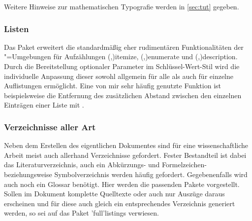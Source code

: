 Weitere Hinweise zur mathematischen Typografie werden in \autoref{sec:tut} 
gegeben.%
%



\subsubsection{%
  Listen%
}

\begin{DeclarePackages}
  Das Paket  erweitert die standardmäßig eher rudimentären 
  Funktionalitäten der "=Umgebungen für Aufzählungen 
  \Environment(,){itemize},
  \Environment(,){enumerate} und
  \Environment(,){description}.
  Durch die Bereitstellung optionaler Parameter im Schlüssel-Wert-Stil wird
  die individuelle Anpassung dieser sowohl allgemein für alle als auch für 
  einzelne Auflistungen ermöglicht. Eine von mir sehr häufig genutzte Funktion 
  ist beispielsweise die Entfernung des zusätzlichen Abstand zwischen den 
  einzelnen Einträgen einer Liste mit .
\end{DeclarePackages}



\subsubsection{%
  Verzeichnisse aller Art%
}

Neben dem Erstellen des eigentlichen Dokumentes sind für eine wissenschaftliche 
Arbeit meist auch allerhand Verzeichnisse gefordert. Fester Bestandteil ist 
dabei das Literaturverzeichnis, auch ein Abkürzungs- und Formelzeichen- 
beziehungsweise Symbolverzeichnis werden häufig gefordert. Gegebenenfalls wird 
auch noch ein Glossar benötigt. Hier werden die passenden Pakete vorgestellt. 
Sollen im Dokument komplette Quelltexte oder auch nur Auszüge daraus erscheinen 
und für diese auch gleich ein entsprechendes Verzeichnis generiert werden, so 
sei auf das Paket \Package'full'{listings} verwiesen.

